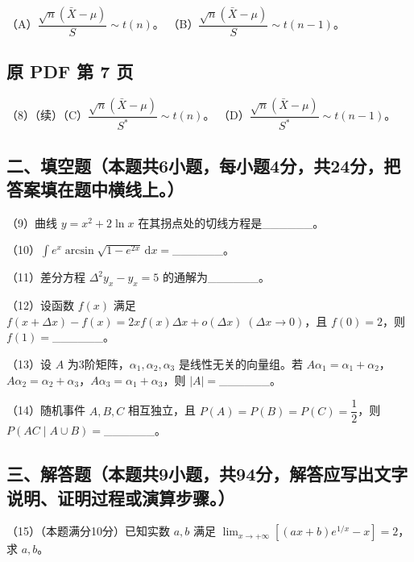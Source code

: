 \documentclass[UTF8,12pt]{ctexart}
\begin{document}
（A）\(\displaystyle \dfrac{\displaystyle \sqrt n(\bar X-\mu)}{\displaystyle S}\sim t(n)\)。 （B）\(\displaystyle \dfrac{\displaystyle \sqrt n(\bar X-\mu)}{\displaystyle S}\sim t(n-1)\)。


\clearpage

\subsection*{原 PDF 第 7 页}

（8）（续）（C）\(\displaystyle \dfrac{\displaystyle \sqrt n(\bar X-\mu)}{\displaystyle S^*}\sim t(n)\)。 （D）\(\displaystyle \dfrac{\displaystyle \sqrt n(\bar X-\mu)}{\displaystyle S^*}\sim t(n-1)\)。


\subsection*{二、填空题（本题共6小题，每小题4分，共24分，把答案填在题中横线上。）}

（9）曲线 \(\displaystyle y=x^2+2\ln x\) 在其拐点处的切线方程是\_\_\_\_\_\_。


（10）\(\displaystyle \int e^x\arcsin\sqrt{1-e^{2x}}\,\mathrm dx=\)\_\_\_\_\_\_。


（11）差分方程 \(\displaystyle \Delta^2y_x-y_x=5\) 的通解为\_\_\_\_\_\_。


（12）设函数 \(\displaystyle f(x)\) 满足 \(\displaystyle f(x+\Delta x)-f(x)=2xf(x)\Delta x+o(\Delta x)\;(\Delta x\to0)\)，且 \(\displaystyle f(0)=2\)，则 \(\displaystyle f(1)=\)\_\_\_\_\_\_。


（13）设 \(\displaystyle A\) 为3阶矩阵，\(\displaystyle \alpha_1,\allowbreak \alpha_2,\allowbreak \alpha_3\) 是线性无关的向量组。若 \(\displaystyle A\alpha_1=\alpha_1+\alpha_2\)，\(\displaystyle A\alpha_2=\alpha_2+\alpha_3\)，\(\displaystyle A\alpha_3=\alpha_1+\alpha_3\)，则 \(\displaystyle |A|=\)\_\_\_\_\_\_。


（14）随机事件 \(\displaystyle A,\allowbreak B,\allowbreak C\) 相互独立，且 \(\displaystyle P(A)=P(B)=P(C)=\dfrac{\displaystyle 1}{\displaystyle 2}\)，则 \(\displaystyle P(AC\mid A\cup B)=\)\_\_\_\_\_\_。


\subsection*{三、解答题（本题共9小题，共94分，解答应写出文字说明、证明过程或演算步骤。）}

（15）（本题满分10分）已知实数 \(\displaystyle a,\allowbreak b\) 满足 \(\displaystyle \lim_{x\to+\infty}[(ax+b)e^{1/x}-x]=2\)，求 \(\displaystyle a,\allowbreak b\)。
\end{document}
